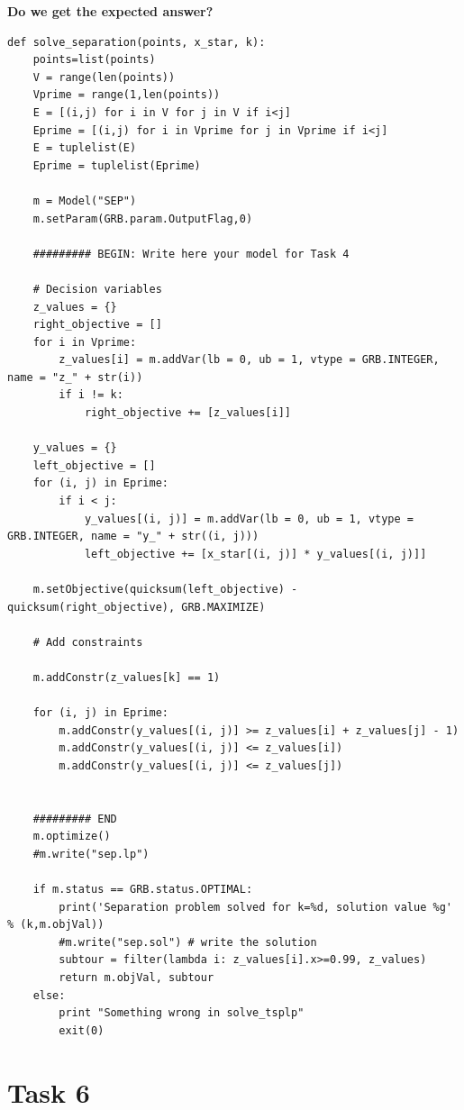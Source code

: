 \documentclass[a4paper,10pt]{article}
\begin{document}
\textbf{Do we get the expected answer?}

\begin{lstlisting}
def solve_separation(points, x_star, k):
    points=list(points)
    V = range(len(points))
    Vprime = range(1,len(points))
    E = [(i,j) for i in V for j in V if i<j]
    Eprime = [(i,j) for i in Vprime for j in Vprime if i<j]
    E = tuplelist(E)
    Eprime = tuplelist(Eprime)

    m = Model("SEP")
    m.setParam(GRB.param.OutputFlag,0)
    
    ######### BEGIN: Write here your model for Task 4

    # Decision variables
    z_values = {}
    right_objective = []
    for i in Vprime:
        z_values[i] = m.addVar(lb = 0, ub = 1, vtype = GRB.INTEGER, name = "z_" + str(i))
        if i != k:
            right_objective += [z_values[i]]
    
    y_values = {}
    left_objective = []
    for (i, j) in Eprime:
        if i < j:
            y_values[(i, j)] = m.addVar(lb = 0, ub = 1, vtype = GRB.INTEGER, name = "y_" + str((i, j)))
            left_objective += [x_star[(i, j)] * y_values[(i, j)]]
    
    m.setObjective(quicksum(left_objective) - quicksum(right_objective), GRB.MAXIMIZE)
    
    # Add constraints
    
    m.addConstr(z_values[k] == 1)
    
    for (i, j) in Eprime:
        m.addConstr(y_values[(i, j)] >= z_values[i] + z_values[j] - 1)
        m.addConstr(y_values[(i, j)] <= z_values[i])
        m.addConstr(y_values[(i, j)] <= z_values[j])
            
    
    ######### END
    m.optimize()
    #m.write("sep.lp")
    
    if m.status == GRB.status.OPTIMAL:
        print('Separation problem solved for k=%d, solution value %g' % (k,m.objVal))
        #m.write("sep.sol") # write the solution    
        subtour = filter(lambda i: z_values[i].x>=0.99, z_values)
        return m.objVal, subtour
    else:
        print "Something wrong in solve_tsplp"
        exit(0)
\end{lstlisting}

\newpage
\section*{Task 6}
\end{document}

